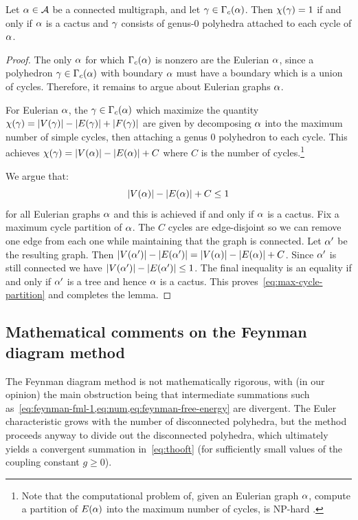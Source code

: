 \begin{lemma}\label{lem:combinatorially-dominant}
    Let $\alpha \in {\cal A}$ be a connected multigraph, and let $\gamma \in \Gamma_c(\alpha)$.
    Then $\chi(\gamma) = 1$ if and only if $\alpha$ is a cactus and $\gamma$ consists of genus-0 polyhedra attached to each cycle of $\alpha$.
\end{lemma}
\begin{proof}
The only $\alpha$ for which $\Gamma_c(\alpha)$ is nonzero are the Eulerian $\alpha$,
since a polyhedron $\gamma \in \Gamma_c(\alpha)$ with boundary $\alpha$ must have a boundary which is a union of cycles.
Therefore, it remains to argue about Eulerian graphs $\alpha$.

For Eulerian $\alpha$, the $\gamma \in \Gamma_c(\alpha)$ which maximize the quantity $\chi(\gamma) = |V(\gamma)| - |E(\gamma)| + |F(\gamma)|$ are given by decomposing $\alpha$ into the maximum number of simple cycles, then attaching a genus 0 polyhedron to each cycle.
This achieves $\chi(\gamma) = |V(\alpha)| - |E(\alpha)| + C$ where $C$ is the number of cycles.\footnote{Note that the computational problem of, given an Eulerian graph $\alpha$, compute a partition of $E(\alpha)$ into the maximum number of cycles, is NP-hard \cite{Holyer81:EdgePartitioning}.}

We argue that:
\begin{equation}\label{eq:max-cycle-partition}
    |V(\alpha)| - |E(\alpha)| + C \leq 1
\end{equation}
for all Eulerian graphs $\alpha$ and this is achieved if and only if $\alpha$ is a cactus.
Fix a maximum cycle partition of $\alpha$. The $C$ cycles are edge-disjoint so we can remove one edge from each one while maintaining that the graph is connected. Let $\alpha'$ be the resulting graph. Then $|V(\alpha')| - |E(\alpha')| = |V(\alpha)| - |E(\alpha)| + C$. Since $\alpha'$ is still connected we have $|V(\alpha')| - |E(\alpha')| \leq 1$.
The final inequality is an equality if and only if $\alpha'$ is a tree and hence $\alpha$ is a cactus.
This proves~\cref{eq:max-cycle-partition} and completes the lemma.
\end{proof}



\subsection{Mathematical comments on the Feynman diagram method}
\label{app:feynman-formal}

The Feynman diagram method is not mathematically rigorous, with (in our opinion)
the main obstruction being that intermediate summations such as~\cref{eq:feynman-fml-1,eq:num,eq:feynman-free-energy} are divergent.
The Euler characteristic grows with the
number of disconnected polyhedra, but the method proceeds anyway to divide out the disconnected polyhedra,
which ultimately yields a convergent summation in~\cref{eq:thooft} (for sufficiently small values of the coupling constant $g \geq 0$).



